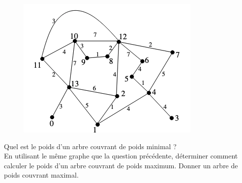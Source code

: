 \documentclass{article}[12pt]
\begin{document}
\begin{figure}[h!]
    \centering
    \includegraphics[scale=0.6]{Kruskal-2.png}
    \label{fig:my_label}
\end{figure}

Quel est le poids d’un arbre couvrant de poids minimal ?\\
En utilisant le même graphe que la question précédente, déterminer comment calculer le poids d’un arbre
couvrant de poids maximum. Donner un arbre de poids couvrant maximal.
\end{document}
